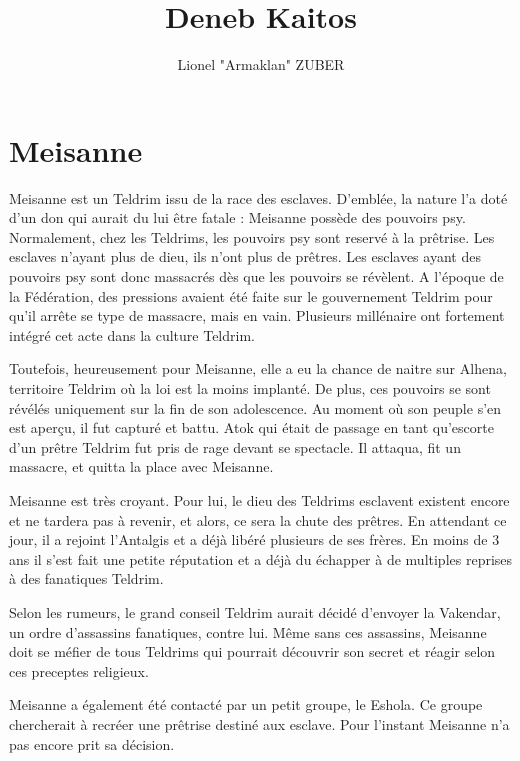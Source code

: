 \documentclass{DenebClass}
\title{Deneb Kaitos}
\author{Lionel "Armaklan" ZUBER}
\begin{document}
\chapter*{Meisanne}

Meisanne est un Teldrim issu de la race des esclaves. D'emblée, la nature l'a doté d'un don qui aurait du lui être fatale : Meisanne possède des pouvoirs psy. Normalement, chez les Teldrims, les pouvoirs psy sont reservé à la prêtrise. Les esclaves n'ayant plus de dieu, ils n'ont plus de prêtres. Les esclaves ayant des pouvoirs psy sont donc massacrés dès que les pouvoirs se révèlent. A l'époque de la Fédération, des pressions avaient été faite sur le gouvernement Teldrim pour qu'il arrête se type de massacre, mais en vain. Plusieurs millénaire ont fortement intégré cet acte dans la culture Teldrim.

Toutefois, heureusement pour Meisanne, elle a eu la chance de naitre sur Alhena, territoire Teldrim où la loi est la moins implanté. De plus, ces pouvoirs se sont révélés uniquement sur la fin de son adolescence. Au moment où son peuple s'en est aperçu, il fut capturé et battu. Atok qui était de passage en tant qu'escorte d'un prêtre Teldrim fut pris de rage devant se spectacle. Il attaqua, fit un massacre, et quitta la place avec Meisanne.

Meisanne est très croyant. Pour lui, le dieu des Teldrims esclavent existent encore et ne tardera pas à revenir, et alors, ce sera la chute des prêtres. En attendant ce jour, il a rejoint l'Antalgis et a déjà libéré plusieurs de ses frères. En moins de 3 ans il s'est fait une petite réputation et a déjà du échapper à de multiples reprises à des fanatiques Teldrim.

Selon les rumeurs, le grand conseil Teldrim aurait décidé d'envoyer la Vakendar, un ordre d'assassins fanatiques, contre lui. Même sans ces assassins, Meisanne doit se méfier de tous Teldrims qui pourrait découvrir son secret et réagir selon ces preceptes religieux. 

Meisanne a également été contacté par un petit groupe, le Eshola. Ce groupe chercherait à recréer une prêtrise destiné aux esclave. Pour l'instant Meisanne n'a pas encore prit sa décision.
\end{document}
